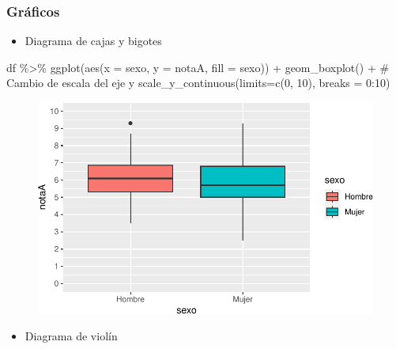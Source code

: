 \documentclass[
  a4paper,
]{scrreport}
\newenvironment{Shaded}{\begin{snugshade}}{\end{snugshade}}
\newcommand{\AttributeTok}[1]{\textcolor[rgb]{0.40,0.45,0.13}{#1}}
\newcommand{\CommentTok}[1]{\textcolor[rgb]{0.37,0.37,0.37}{#1}}
\newcommand{\DecValTok}[1]{\textcolor[rgb]{0.68,0.00,0.00}{#1}}
\newcommand{\FunctionTok}[1]{\textcolor[rgb]{0.28,0.35,0.67}{#1}}
\newcommand{\NormalTok}[1]{\textcolor[rgb]{0.00,0.23,0.31}{#1}}
\newcommand{\SpecialCharTok}[1]{\textcolor[rgb]{0.37,0.37,0.37}{#1}}
\providecommand{\tightlist}{%
  \setlength{\itemsep}{0pt}\setlength{\parskip}{0pt}}\usepackage{longtable,booktabs,array}
\theoremstyle{definition}
\theoremstyle{definition}
\theoremstyle{remark}
\begin{document}
\hypertarget{gruxe1ficos-2}{%
\subsubsection{Gráficos}\label{gruxe1ficos-2}}

\begin{itemize}
\tightlist
\item
  Diagrama de cajas y bigotes
\end{itemize}

\begin{Shaded}
\begin{Highlighting}[]
\NormalTok{df }\SpecialCharTok{\%\textgreater{}\%} \FunctionTok{ggplot}\NormalTok{(}\FunctionTok{aes}\NormalTok{(}\AttributeTok{x =}\NormalTok{ sexo, }\AttributeTok{y =}\NormalTok{ notaA, }\AttributeTok{fill =}\NormalTok{ sexo)) }\SpecialCharTok{+} 
  \FunctionTok{geom\_boxplot}\NormalTok{() }\SpecialCharTok{+}
  \CommentTok{\# Cambio de escala del eje y}
  \FunctionTok{scale\_y\_continuous}\NormalTok{(}\AttributeTok{limits=}\FunctionTok{c}\NormalTok{(}\DecValTok{0}\NormalTok{, }\DecValTok{10}\NormalTok{), }\AttributeTok{breaks =} \DecValTok{0}\SpecialCharTok{:}\DecValTok{10}\NormalTok{)}
\end{Highlighting}
\end{Shaded}

\begin{figure}[H]

{\centering \includegraphics{08-analisis-estadisticos_files/figure-pdf/unnamed-chunk-28-1.pdf}

}

\end{figure}

\begin{itemize}
\tightlist
\item
  Diagrama de violín
\end{itemize}
\end{document}
